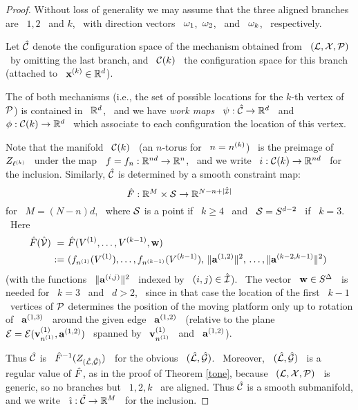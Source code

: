 \begin{proof}
%
Without loss of generality we may assume that the three aligned
branches are \ $1,2$ \ and $k$, \ with direction vectors \
$\mathbf{\omega}_{1}$,\ $\mathbf{\omega}_{2}$, \ and \ $\mathbf{\omega}_{k}$, \ respectively.

Let $\hat{\mathcal{C}}$ denote the configuration space of the mechanism obtained
from \ $(\mathcal{L},\mathcal{X},\mathcal{P})$ \ by omitting the last branch, and \ $\mathcal{C}(k)$
\ the configuration space for this branch (attached to \
$\mathbf{x}\sp{({k})}\in{\mathbb R}^{d}$). 

The \emph{\wspace} of both mechanisms (i.e., the set of possible
locations for the $k$-th vertex of $\mathcal{P}$) is contained in \ ${\mathbb R}^{d}$, \
and we have \emph{work maps} \ $\psi:\hat{\mathcal{C}}\to{\mathbb R}^{d}$ \ and \
$\phi:\mathcal{C}(k)\to{\mathbb R}^{d}$ \ which associate to each configuration the
location of this vertex.

Note that the manifold \ $\mathcal{C}(k)$ \ (an $n$-torus for \ $n=n\sp{({k})}$) \
is the preimage of \ $Z_{\ell\sp{({k})}}$ \ under the map \
$f=f_{n}:{\mathbb R}^{nd}\to{\mathbb R}^{n}$, \ and we write \ $i:\mathcal{C}(k)\to{\mathbb R}^{nd}$ \ for
the inclusion. Similarly, $\hat{\mathcal{C}}$ is determined by a smooth
constraint map:
$$
\hat{F}:{\mathbb R}^{M}\times\mathcal{S}\to{\mathbb R}^{N-n+|\hat{\mathcal{I}}|}
$$
%
for \ $M=(N-n)d$, \ where $\mathcal{S}$ is a point if \ $k\geq 4$ \ and \
$\mathcal{S}=S^{d-2}$ \ if \ $k=3$. \ Here
%
\begin{equation}\label{econstn}
%
\begin{split}
%
\hF(\hV)~=&~\hF(\Vj{1},\dotsc,\Vj{k-1},\bw)~\\
:=&~(f_{\nj{1}}(\Vj{1}),\dotsc,f_{\nj{k-1}}(\Vj{k-1}),\,
\|\aj{1,2}\|^{2},\,\dotsc,\|\aj{k-2,k-1}\|^{2})~
%
\end{split}
%
\end{equation}
%
(with the functions \ $\|\mathbf{a}\sp{({i,j})}\|^{2}$ \ indexed by \
$(i,j)\in\hat{\mathcal{I}}$). \ The vector \ $\mathbf{w}\in S^{\Delta}$ \ is needed for \
$k=3$ \ and \ $d>2$, \ since in that case the location of the first \
$k-1$ \ vertices of $\mathcal{P}$ determines the position of the moving
platform only up to rotation of \ $\mathbf{a}\sp{({1,3})}$ \ around the given edge \
$\mathbf{a}\sp{({1,2})}$ \ (relative to the plane \
$\mathcal{E}=\mathcal{E}(\mathbf{v}\sp{({1})}_{n\sp{({1})}},\mathbf{a}\sp{({1,2})})$ \ spanned by \
$\mathbf{v}\sp{({1})}_{n\sp{({1})}}$ \ and \ $\mathbf{a}\sp{({1,2})}$).

Thus $\hat{\mathcal{C}}$ is \ $\hat{F}^{-1}(Z_{(\hat{\mathcal{L}},\hat{\mathcal{G}})})$ \
for the obvious \ $(\hat{\mathcal{L}},\hat{\mathcal{G}})$. \
Moreover, \ $(\hat{\mathcal{L}},\hat{\mathcal{G}})$ \ is a regular value of $\hat{F}$,
as in the proof of Theorem \ref{tone}, because \ $(\mathcal{L},\mathcal{X},\mathcal{P})$ \
is generic, so no branches but \ $1,2,k$ \ are aligned.
Thus $\hat{\mathcal{C}}$ is a smooth submanifold, and we write \
$\hi:\hC\to\RR{M}$ \ for the inclusion.


\end{proof}
